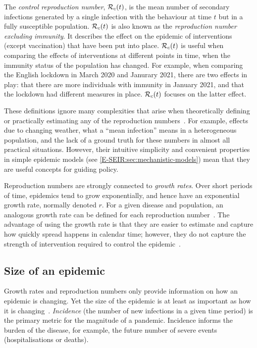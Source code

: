 \documentclass[thesis.tex]{subfiles}
\begin{document}
The \emph{control reproduction number}, $\mathcal{R}_{c}(t)$, is the mean number of secondary infections generated by a single infection with the behaviour at time $t$ but in a fully susceptible population.
$\mathcal{R}_{c}(t)$ is also known as the \emph{reproduction number excluding immunity}.
It describes the effect on the epidemic of interventions (except vaccination) that have been put into place.
$\mathcal{R}_{c}(t)$ is useful when comparing the effects of interventions at different points in time, when the immunity status of the population has changed.
For example, when comparing the English lockdown in March 2020 and Janurary 2021, there are two effects in play: that there are more individuals with immunity in January 2021, and that the lockdown had different measures in place.
$\mathcal{R}_{c}(t)$ focuses on the latter effect.

These definitions ignore many complexities that arise when theoretically defining or practically estimating any of the reproduction numbers~\autocite{pellisEstimation}.
For example, effects due to changing weather, what a ``mean infection'' means in a heterogeneous population, and the lack of a ground truth for these numbers in almost all practical situations.
However, their intuitive simplicity and convenient properties in simple epidemic models (see \cref{E-SEIR:sec:mechanistic-models}) mean that they are useful concepts for guiding policy.

Reproduction numbers are strongly connected to \emph{growth rates}.
Over short periods of time, epidemics tend to grow exponentially, and hence have an exponential growth rate, normally denoted $r$.
For a given disease and population, an analogous growth rate can be defined for each reproduction number~\autocite{pellisEstimation,paragGrowthRates,wallingaGI}.
The advantage of using the growth rate is that they are easier to estimate and capture how quickly spread happens in calendar time; however, they do not capture the strength of intervention required to control the epidemic~\autocite{royalSocietyRnumber}.

\subsection{Size of an epidemic}

Growth rates and reproduction numbers only provide information on how an epidemic is changing.
Yet the size of the epidemic is at least as important as how it is changing~\autocite{pellisEstimation}.
\emph{Incidence} (the number of new infections in a given time period) is the primary metric for the magnitude of a pandemic.
Incidence informs the burden of the disease, for example, the future number of severe events (hospitalisations or deaths).
\end{document}
